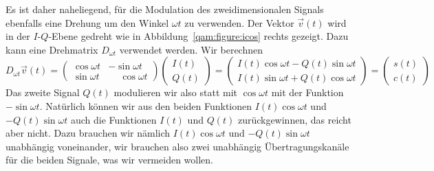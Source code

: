 Es ist daher naheliegend, für die Modulation des zweidimensionalen Signals
ebenfalls eine Drehung um den Winkel $\omega t$ zu verwenden.
Der Vektor $\vec{v}(t)$ wird in der $I$-$Q$-Ebene gedreht wie in
Abbildung~\ref{qam:figure:icos} rechts gezeigt.
Dazu kann eine Drehmatrix $D_{\omega t}$ verwendet werden.
Wir berechnen
\begin{equation}
D_{\omega t}
\vec{v}(t)
=
\begin{pmatrix}
\cos\omega t & -\sin\omega t\\
\sin\omega t &\phantom{-}\cos\omega t
\end{pmatrix}
\begin{pmatrix}I(t)\\Q(t)\end{pmatrix}
=
\begin{pmatrix}
I(t)\cos\omega t - Q(t) \sin\omega t\\
I(t)\sin\omega t + Q(t) \cos\omega t
\end{pmatrix}
=
\begin{pmatrix}
s(t)\\c(t)
\end{pmatrix}
\label{qam:eqn:modulation}
\end{equation}
Das zweite Signal $Q(t)$ modulieren wir also statt mit $\cos\omega t$ 
mit der Funktion $-\sin\omega t$.
Natürlich können wir aus den beiden Funktionen $I(t)\cos\omega t$ und
$-Q(t)\sin\omega t$ auch die Funktionen $I(t)$ und $Q(t)$ zurückgewinnen,
das reicht aber nicht.
Dazu brauchen wir nämlich $I(t)\cos\omega t$ und $-Q(t)\sin\omega t$
unabhängig voneinander, wir brauchen also zwei unabhängig Übertragungskanäle
für die beiden Signale, was wir vermeiden wollen.

